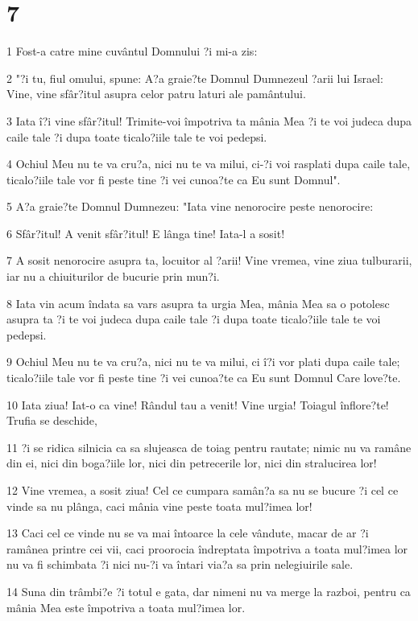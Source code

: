 \chapter{7}

\par 1 Fost-a catre mine cuvântul Domnului ?i mi-a zis:
\par 2 "?i tu, fiul omului, spune: A?a graie?te Domnul Dumnezeul ?arii lui Israel: Vine, vine sfâr?itul asupra celor patru laturi ale pamântului.
\par 3 Iata î?i vine sfâr?itul! Trimite-voi împotriva ta mânia Mea ?i te voi judeca dupa caile tale ?i dupa toate ticalo?iile tale te voi pedepsi.
\par 4 Ochiul Meu nu te va cru?a, nici nu te va milui, ci-?i voi rasplati dupa caile tale, ticalo?iile tale vor fi peste tine ?i vei cunoa?te ca Eu sunt Domnul".
\par 5 A?a graie?te Domnul Dumnezeu: "Iata vine nenorocire peste nenorocire:
\par 6 Sfâr?itul! A venit sfâr?itul! E lânga tine! Iata-l a sosit!
\par 7 A sosit nenorocire asupra ta, locuitor al ?arii! Vine vremea, vine ziua tulburarii, iar nu a chiuiturilor de bucurie prin mun?i.
\par 8 Iata vin acum îndata sa vars asupra ta urgia Mea, mânia Mea sa o potolesc asupra ta ?i te voi judeca dupa caile tale ?i dupa toate ticalo?iile tale te voi pedepsi.
\par 9 Ochiul Meu nu te va cru?a, nici nu te va milui, ci î?i vor plati dupa caile tale; ticalo?iile tale vor fi peste tine ?i vei cunoa?te ca Eu sunt Domnul Care love?te.
\par 10 Iata ziua! Iat-o ca vine! Rândul tau a venit! Vine urgia! Toiagul înflore?te! Trufia se deschide,
\par 11 ?i se ridica silnicia ca sa slujeasca de toiag pentru rautate; nimic nu va ramâne din ei, nici din boga?iile lor, nici din petrecerile lor, nici din stralucirea lor!
\par 12 Vine vremea, a sosit ziua! Cel ce cumpara samân?a sa nu se bucure ?i cel ce vinde sa nu plânga, caci mânia vine peste toata mul?imea lor!
\par 13 Caci cel ce vinde nu se va mai întoarce la cele vândute, macar de ar ?i ramânea printre cei vii, caci proorocia îndreptata împotriva a toata mul?imea lor nu va fi schimbata ?i nici nu-?i va întari via?a sa prin nelegiuirile sale.
\par 14 Suna din trâmbi?e ?i totul e gata, dar nimeni nu va merge la razboi, pentru ca mânia Mea este împotriva a toata mul?imea lor.

